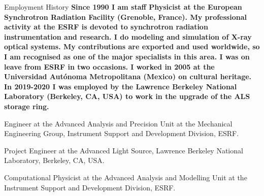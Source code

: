 \begin{rubric}{Employment History}
\entry*[]%
\textbf{Since 1990 I am staff Physicist at the European Synchrotron Radiation Facility (Grenoble, France). My professional activity at the ESRF is devoted to synchrotron radiation instrumentation and research. I do modeling and simulation of X-ray optical systems. My contributions are exported and used worldwide, so I am recognised as one of the major specialists in this area. I was on leave from ESRF in two occasions. I worked in 2005 at the Universidad Aut\'onoma Metropolitana (Mexico) on cultural heritage. In 2019-2020 I was employed by the Lawrence Berkeley National Laboratory (Berkeley, CA, USA) to work in the upgrade of the ALS storage ring.}

% 
Engineer at the Advanced Analysis and Precision Unit at the Mechanical Engineering Group, Instrument Support and Development Division, ESRF.   

\entry*[2019/7/15 –- 2020/6/14]
Project Engineer at the Advanced Light Source, Lawrence Berkeley National Laboratory, Berkeley, CA, USA. 

\entry*[2009 –- 2019]  Computational Physicist at the Advanced Analysis and Modelling Unit at the Instrument Support and Development Division, ESRF. 



\end{rubric}
